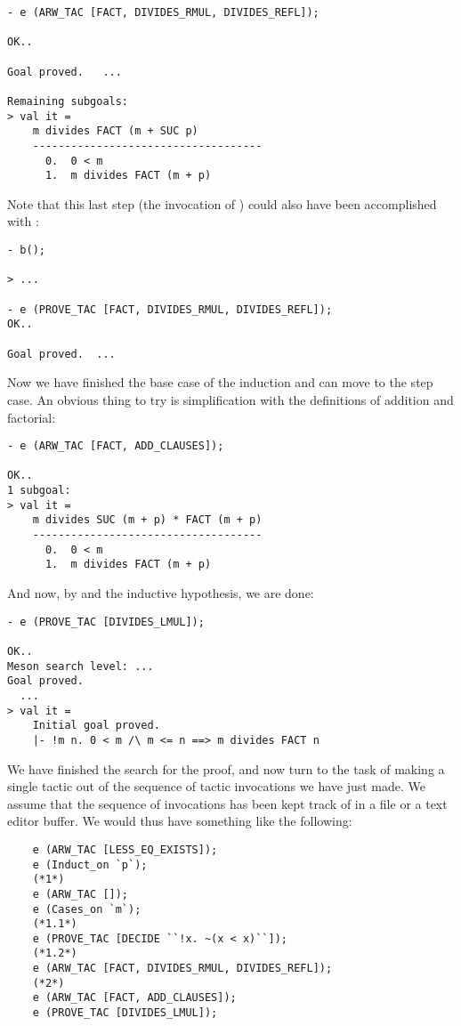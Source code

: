 \begin{session}\begin{verbatim}
- e (ARW_TAC [FACT, DIVIDES_RMUL, DIVIDES_REFL]);

OK..

Goal proved.   ...

Remaining subgoals:
> val it =
    m divides FACT (m + SUC p)
    ------------------------------------
      0.  0 < m
      1.  m divides FACT (m + p)
\end{verbatim}\end{session}
Note that this last step (the invocation of )
could also have been accomplished with :
\begin{session}\begin{verbatim}
- b();

> ...

- e (PROVE_TAC [FACT, DIVIDES_RMUL, DIVIDES_REFL]);
OK..

Goal proved.  ...
\end{verbatim}\end{session}
Now we have finished the base case of the induction and can move to the
step case. An obvious thing to try is simplification with the
definitions of addition and factorial:
\begin{session}\begin{verbatim}
- e (ARW_TAC [FACT, ADD_CLAUSES]);

OK..
1 subgoal:
> val it =
    m divides SUC (m + p) * FACT (m + p)
    ------------------------------------
      0.  0 < m
      1.  m divides FACT (m + p)
\end{verbatim}\end{session}
\noindent And now, by  and the inductive hypothesis, we are
done:
\begin{session}\begin{verbatim}
- e (PROVE_TAC [DIVIDES_LMUL]);

OK..
Meson search level: ...
Goal proved.
  ...
> val it =
    Initial goal proved.
    |- !m n. 0 < m /\ m <= n ==> m divides FACT n
\end{verbatim}\end{session}
We have finished the search for the proof, and now turn to the task of
making a single tactic out of the sequence of tactic invocations we have
just made. We assume that the sequence of invocations has been kept
track of in a file or a text editor buffer. We would thus have something
like the following:
{\small \begin{verbatim}
    e (ARW_TAC [LESS_EQ_EXISTS]);
    e (Induct_on `p`);
    (*1*)
    e (ARW_TAC []);
    e (Cases_on `m`);
    (*1.1*)
    e (PROVE_TAC [DECIDE ``!x. ~(x < x)``]);
    (*1.2*)
    e (ARW_TAC [FACT, DIVIDES_RMUL, DIVIDES_REFL]);
    (*2*)
    e (ARW_TAC [FACT, ADD_CLAUSES]);
    e (PROVE_TAC [DIVIDES_LMUL]);
\end{verbatim}}
\noindent

